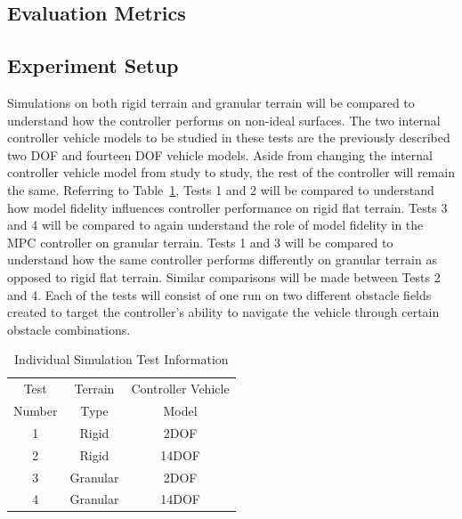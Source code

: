 \documentclass[12pt,twocolumn]{article}
\begin{document}

\subsection{Evaluation Metrics}\label{ss:Metrics}


\subsection{Experiment Setup }\label{ss:Setup}
Simulations on both rigid terrain and granular terrain will be compared to understand how the controller performs on non-ideal surfaces.  The two internal controller vehicle models to be studied in these tests are the previously described two DOF and fourteen DOF vehicle models. Aside from changing the internal controller vehicle model from study to study, the rest of the controller will remain the same. Referring to Table~\ref{t:TestMatrix}, Tests 1 and 2 will be compared to understand how model fidelity influences controller performance on rigid flat terrain. Tests 3 and 4 will be compared to again understand the role of model fidelity in the MPC controller on granular terrain. Tests 1 and 3 will be compared to understand how the same controller performs differently on granular terrain as opposed to rigid flat terrain. Similar comparisons will be made between Tests 2 and 4. Each of the tests will consist of one run on two different obstacle fields created to target the controller’s ability to navigate the vehicle through certain obstacle combinations.

\begin{table}
\begin{center}
	\begin{tabular}{||c c c||} 
		\hline
		Test  & Terrain  & Controller Vehicle \\
		Number &  Type & Model\\ [0.5ex] 	
		\hline\hline
		1 & Rigid & 2DOF \\ 
		\hline
		2 & Rigid & 14DOF \\
		\hline
		3 & Granular & 2DOF \\
		\hline
		4 & Granular & 14DOF \\
		\hline
	\end{tabular}
\end{center}
\caption{Individual Simulation Test Information}
\label{t:TestMatrix}
\end{table}
\end{document}
